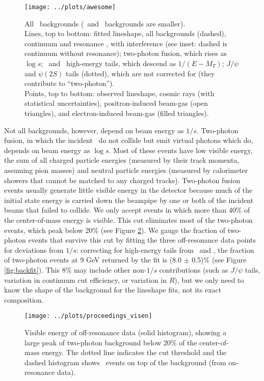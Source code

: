 \documentclass[aps,prd,preprint,superscriptaddress,tightenlines,nofootinbib,floatfix]{revtex4}
\begin{document}
\begin{figure}[p]
  \texttt{[image: ../plots/awesome]}

  \caption{\label{fig:awesome} All \uthree\ backgrounds (\uone\ and
  \utwo\ backgrounds are smaller).  \vspace{0.2 cm} \\
  Lines, top to bottom: fitted lineshape, all backgrounds (dashed),
  continuum and resonance \tautau, with interference (see inset:
  dashed is continuum without resonance); two-photon fusion, which
  rises as $\log s$; \utwo\ and \uone\ high-energy tails, which
  descend as $1/(E-M_\Upsilon)$; $J/\psi$ and $\psi(2S)$ tails
  (dotted), which are not corrected for (they contribute to
  ``two-photon''). \vspace{0.2 cm} \\ Points, top to bottom: observed
  lineshape, cosmic rays (with statistical uncertainties),
  positron-induced beam-gas (open triangles), and electron-induced
  beam-gas (filled triangles).}
\end{figure}

Not all backgrounds, however, depend on beam energy as $1/s$.
Two-photon fusion, in which the incident \ee\ do not collide but emit
virtual photons which do, depends on beam energy as $\log s$.  Most of
these events have low visible energy, the sum of all charged particle
energies (measured by their track momenta, assuming pion masses) and
neutral particle energies (measured by calorimeter showers that cannot
be matched to any charged tracks).  Two-photon fusion events usually
generate little visible energy in the detector because much of the
initial state energy is carried down the beampipe by one or both of
the incident beams that failed to collide.  We only accept events in
which more than 40\% of the center-of-mass energy is visible.  This
cut eliminates most of the two-photon events, which peak below 20\%
(see Figure \ref{fig:visen}).  We gauge the fraction of two-photon
events that survive this cut by fitting the three off-resonance data
points for deviations from $1/s$: correcting for high-energy tails
from \uone\ and \utwo, the fraction of two-photon events at 9 GeV
returned by the fit is (8.0 $\pm$ 0.5)\% (see Figure
\ref{fig:backfit}).  This 8\% may include other non-$1/s$
contributions (such as $J/\psi$ tails, variation in continuum cut
efficiency, or variation in $R$), but we only need to know the shape
of the background for the lineshape fits, not its exact composition.

\begin{figure}[p]
  \begin{center}
    \texttt{[image: ../plots/proceedings\_visen]}
  \end{center}
  \caption{\label{fig:visen} Visible energy of off-resonance data
    (solid histogram), showing a large peak of two-photon background
    below 20\% of the center-of-mass energy.  The dotted line
    indicates the cut threshold and the dashed histogram shows \ups\
    events on top of the background (from on-resonance data).}
\end{figure}
\end{document}
